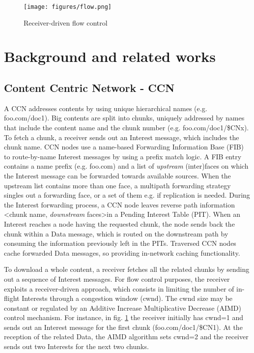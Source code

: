 \documentclass{sig-alternate-10pt}
\begin{document}
\begin{figure}[t]
\centering
\texttt{[image: figures/flow.png]}
\caption{Receiver-driven flow control}
\label{f:flow}
\vspace{-10pt}
\end{figure}

\section{Background and related works}
\subsection*{Content Centric Network - CCN}
A CCN addresses contents by using unique hierarchical names \cite{jacobson2009networking} (e.g. foo.com/doc1). Big contents are split into chunks, uniquely addressed by names that include the content name and the chunk number (e.g. foo.com/doc1/\$CNx).
To fetch a chunk, a receiver sends out an Interest message, which includes the chunk name. CCN nodes use a name-based Forwarding Information Base (FIB) to route-by-name Interest messages by using a prefix match logic. A FIB entry contains a name prefix (e.g. foo.com) and a list of \emph{upstream} (inter)faces on which the Interest message can be forwarded towards available sources. When the upstream list contains more than one face, a multipath forwarding strategy singles out a forwarding face, or a set of them e.g. if replication is needed.
During the Interest forwarding process, a CCN node leaves reverse path information  \textless chunk name, \emph{downstream} faces\textgreater in a Pending Interest Table (PIT). When an Interest reaches a node having the requested chunk, the node sends back the chunk within a Data message, which is routed on the downstream path by consuming the information previously left in the PITs. Traversed CCN nodes cache forwarded Data messages, so providing in-network caching functionality.

To download a whole content, a receiver fetches all the related chunks by sending out a sequence of Interest messages. For flow control purposes, the receiver exploits a receiver-driven approach, which consists in limiting the number of in-flight Interests through a congestion window (cwnd). The cwnd size may be constant or regulated by an Additive Increase Multiplicative Decrease (AIMD) control mechanism. For instance, in fig. \ref{f:flow} the receiver initially has cwnd=1 and sends out an Interest message for the first chunk (foo.com/doc1/\$CN1). At the reception of the related Data, the AIMD algorithm sets cwnd=2 and the receiver sends out two Interests for the next two chunks.
\end{document}
